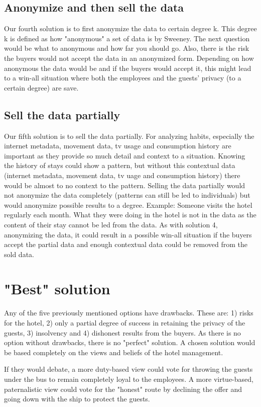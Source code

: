 \subsection{Anonymize and then sell the data}
Our fourth solution is to first anonymize the data to certain degree k. This degree k is defined as how "anonymous" a set of data is by Sweeney\cite{k_anonymity}. The next question would be what to anonymous and how far you should go. Also, there is the risk the buyers would not accept the data in an anonymized form. Depending on how anonymous the data would be and if the buyers would accept it, this might lead to a win-all situation where both the employees and the guests' privacy (to a certain degree) are save.

\subsection{Sell the data partially}
Our fifth solution is to sell the data partially. For analyzing habits, especially the internet metadata, movement data, tv usage and consumption history are important as they provide so much detail and context to a situation. Knowing the history of stays could show a pattern, but without this contextual data (internet metadata, movement data, tv uage and consumption history) there would be almost to no context to the pattern. Selling the data partially would not anonymize the data completely (patterns can still be led to individuals) but would anonymize possible results to a degree. Example: Someone visits the hotel regularly each month. What they were doing in the hotel is not in the data as the content of their stay cannot be led from the data. As with solution 4, anonymizing the data, it could result in a possible win-all situation if the buyers accept the partial data and enough contextual data could be removed from the sold data.

\section{"Best" solution} 
Any of the five previously mentioned options have drawbacks. These are: 1) risks for the hotel, 2) only a partial degree of success in retaining the privacy of the guests, 3) insolvency and 4) dishonest results from the buyers. As there is no option without drawbacks, there is no "perfect" solution. A chosen solution would be based completely on the views and beliefs of the hotel management.

If they would debate, a more duty-based view could vote for throwing the guests under the bus to remain completely loyal to the employees. A more virtue-based, paternalistic view could vote for the "honest" route by declining the offer and going down with the ship to protect the guests.

